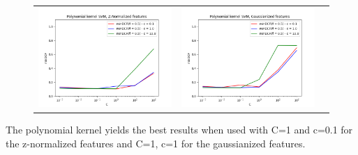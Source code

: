 \documentclass[12pt,a4paper]{article}
\begin{document}
\begin{figure}[H]
    \begin{center}
        \hspace*{-25pt}
        \begin{tabular}{ccc}
            \includegraphics[width = 200pt]{img/evaluation_plots/polynomial-svm-z-normalized-C-c.png} &
            \includegraphics[width = 200pt]{img/evaluation_plots/polynomial-svm-gaussianized-C-c.png}   \\
        \end{tabular}
    \end{center}
\end{figure}
\vspace{-20pt}
\noindent
The polynomial kernel yields the best results when used with C=1 and c=0.1 for the z-normalized features and C=1, c=1 for the gaussianized features. \\
\end{document}
